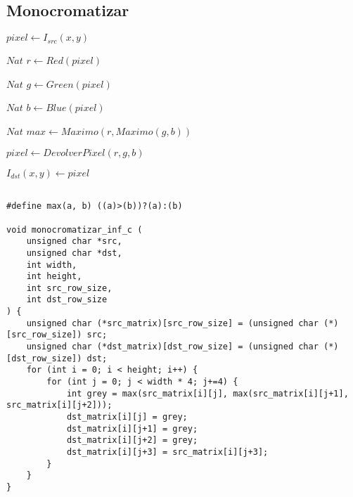 \subsection{Monocromatizar}


\begin{algorithm}[H]
  \begin{algorithmic}[1]
			  
			  \STATE $pixel \gets I_{src}(x,y)$
			  
			  \STATE $Nat$ $ r \gets Red(pixel) $
			  
			  \STATE $Nat$ $g \gets Green(pixel)$
			  
			  \STATE $Nat$ $ b \gets Blue(pixel)$
			  
			  \STATE $Nat$ $max \gets Maximo(r, Maximo(g, b))$
			  
			  \STATE $pixel \gets DevolverPixel(r,g,b)$
			
			  \STATE $I_{dst}(x,y) \gets pixel$
			  
			\ENDFOR

		 \ENDFOR

  \end{algorithmic}
  \caption{$monocromatizar (I_{src}, I_{dst})$}
  \label{alg:ondas}
\end{algorithm}






\begin{codesnippet}
\begin{verbatim}

#define max(a, b) ((a)>(b))?(a):(b)

void monocromatizar_inf_c (
	unsigned char *src, 
	unsigned char *dst, 
	int width, 
	int height, 
	int src_row_size, 
	int dst_row_size
) {
    unsigned char (*src_matrix)[src_row_size] = (unsigned char (*)[src_row_size]) src;
    unsigned char (*dst_matrix)[dst_row_size] = (unsigned char (*)[dst_row_size]) dst;
    for (int i = 0; i < height; i++) {
        for (int j = 0; j < width * 4; j+=4) {
            int grey = max(src_matrix[i][j], max(src_matrix[i][j+1], src_matrix[i][j+2]));
            dst_matrix[i][j] = grey;
            dst_matrix[i][j+1] = grey;
            dst_matrix[i][j+2] = grey;
            dst_matrix[i][j+3] = src_matrix[i][j+3];
        }
    }
}

\end{verbatim}
\end{codesnippet}
